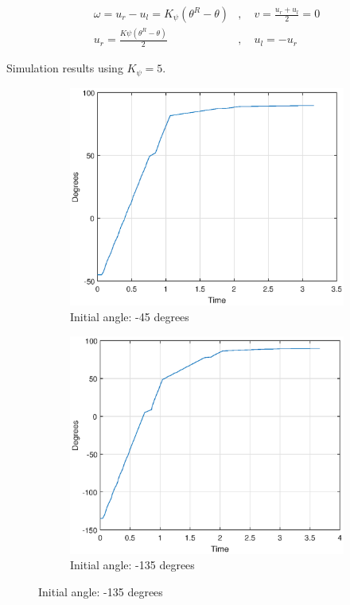 
\begin{equation}
\begin{aligned}
    \omega = u_r - u_l = K_\psi (\theta^R-\theta)& , \quad v = \frac{u_r + u_l}{2}= 0 \\
    u_r = \frac{K\psi(\theta^R - \theta)}{2}&, \quad u_l = - u_r
\end{aligned}
\end{equation}

Simulation results using $K_\psi=5$.

\begin{figure}[H]
    \centering
    \begin{subfigure}[b]{7cm}
        \includegraphics[width=\textwidth]{rotation_m45.eps}
        \caption{Initial angle: -45 degrees}
        \label{fig:m45deg}
    \end{subfigure}
    \begin{subfigure}[b]{7cm}
        \includegraphics[width=\textwidth]{rotation_m135.eps}
        \caption{Initial angle: -135 degrees}
        \label{fig:m135deg}
    \end{subfigure}
   

\end{figure}
